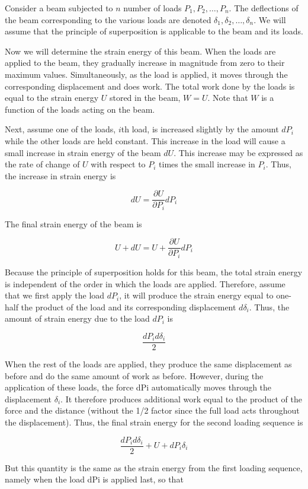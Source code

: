 \documentclass[
10pt,
a4paper,
openany,
svgnames,
]{kaobook} %
\begin{document}
Consider a beam subjected to $n$ number of loads $P_1, P_2, \ldots, P_n$. The deflections of the beam corresponding to the various loads are denoted $\delta_1, \delta_2, \ldots, \delta_n$. We will assume that the principle of superposition is applicable to the beam and its loads.

Now we will determine the strain energy of this beam. When the loads are applied to the beam, they gradually increase in magnitude from zero to their maximum values. Simultaneously, as the load is applied, it moves through the corresponding displacement and does work. The total work done by the loads is equal to the strain energy $U$ stored in the beam, $W = U$. Note that $W$ is a function of the loads acting on the beam.

Next, assume one of the loads, $i$th load, is increased slightly by the amount $dP_i$ while the other loads are held constant. This increase in the load will cause a small increase in strain energy of the beam $dU$. This increase may be expressed as the rate of change of $U$ with respect to $P_i$ times the small increase in $P_i$. Thus, the increase in strain energy is

\[dU = \frac{\partial U}{\partial P_i} dP_i\]

The final strain energy of the beam is

\[U + dU = U + \frac{\partial U}{\partial P_i} dP_i\]

Because the principle of superposition holds for this beam, the total strain energy is independent of the order in which the loads are applied. Therefore, assume that we first apply the load $dP_i$, it will produce the strain energy equal to one-half the product of the load and its corresponding displacement $d\delta_i$. Thus, the amount of strain energy due to the load $dP_i$ is

\[\frac{dP_i d\delta _i}{2}\]

When the rest of the loads are applied, they produce the same displacement as before and do the same amount of work as before. However, during the application of these loads, the force dPi automatically moves through the displacement $\delta_i$. It therefore produces additional work equal to the product of the force and the distance (without the 1/2 factor since the full load acts throughout the displacement). Thus, the final strain energy for the second loading sequence is

\[\frac{dP_i d\delta _i}{2} + U + dP_i\delta _i\]

But this quantity is the same as the strain energy from the first loading sequence, namely when the load dPi is applied last, so that
\end{document}
